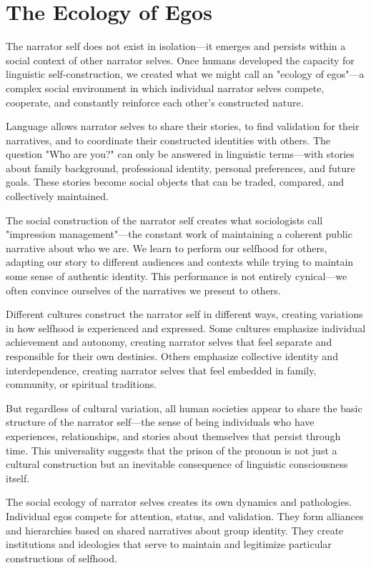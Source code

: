 \section{The Ecology of Egos}

The narrator self does not exist in isolation—it emerges and persists within a social context of other narrator selves. Once humans developed the capacity for linguistic self-construction, we created what we might call an "ecology of egos"—a complex social environment in which individual narrator selves compete, cooperate, and constantly reinforce each other's constructed nature.

Language allows narrator selves to share their stories, to find validation for their narratives, and to coordinate their constructed identities with others. The question "Who are you?" can only be answered in linguistic terms—with stories about family background, professional identity, personal preferences, and future goals. These stories become social objects that can be traded, compared, and collectively maintained.

The social construction of the narrator self creates what sociologists call "impression management"—the constant work of maintaining a coherent public narrative about who we are. We learn to perform our selfhood for others, adapting our story to different audiences and contexts while trying to maintain some sense of authentic identity. This performance is not entirely cynical—we often convince ourselves of the narratives we present to others.

Different cultures construct the narrator self in different ways, creating variations in how selfhood is experienced and expressed. Some cultures emphasize individual achievement and autonomy, creating narrator selves that feel separate and responsible for their own destinies. Others emphasize collective identity and interdependence, creating narrator selves that feel embedded in family, community, or spiritual traditions.

But regardless of cultural variation, all human societies appear to share the basic structure of the narrator self—the sense of being individuals who have experiences, relationships, and stories about themselves that persist through time. This universality suggests that the prison of the pronoun is not just a cultural construction but an inevitable consequence of linguistic consciousness itself.

The social ecology of narrator selves creates its own dynamics and pathologies. Individual egos compete for attention, status, and validation. They form alliances and hierarchies based on shared narratives about group identity. They create institutions and ideologies that serve to maintain and legitimize particular constructions of selfhood.

